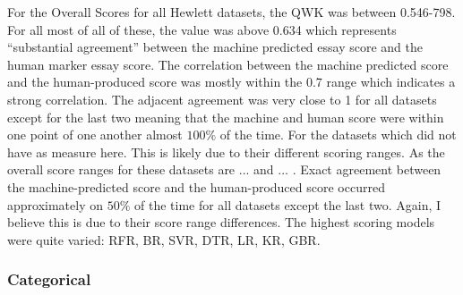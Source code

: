 For the Overall Scores for all Hewlett datasets, the QWK was between 0.546-798. For all most of all of these, the value was above 0.634  which represents “substantial agreement” between the machine predicted essay score and the human marker essay score. The correlation between the machine predicted score and the human-produced score was mostly within the 0.7 range which indicates a strong correlation. The adjacent agreement was very close to 1 for all datasets except for the last two meaning that the machine and human score were within one point of one another almost $100\%$ of the time. For the datasets which did not have as measure here. This is likely due to their different scoring ranges. As the overall score ranges for these datasets are ... and ... . Exact agreement between the machine-predicted score and the human-produced score occurred approximately on $50\%$ of the time for all datasets except the last two. Again, I believe this is due to their score range differences. The highest scoring models were quite varied: RFR, BR, SVR, DTR, LR, KR, GBR.

\subsubsection{Categorical}

